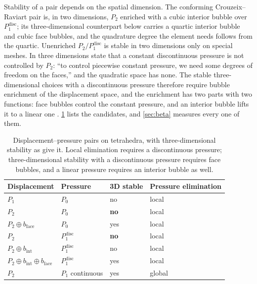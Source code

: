 \documentclass{article}
\theoremstyle{definition}
\theoremstyle{plain}
\begin{document}
Stability of a pair depends on the spatial dimension. The conforming Crouzeix--Raviart pair \cite{CrouzeixRaviart:1973} is, in two
dimensions, $P_2$ enriched with a cubic interior bubble over
$P_1^{\mathrm{disc}}$; its three-dimensional counterpart below carries a
quartic interior bubble and cubic face bubbles, and the quadrature degree the
element needs follows from the quartic. Unenriched
$P_2/P_1^{\mathrm{disc}}$ is stable in two dimensions only on special meshes.
In three dimensions \textcite[\S8.7]{BoffiBrezziFortin:2013} state that a
constant discontinuous pressure is not controlled by $P_2$: ``to control
piecewise constant pressure, we need some degrees of freedom on the faces,''
and the quadratic space has none. The stable three-dimensional choices with a
discontinuous pressure therefore require bubble enrichment of the displacement
space, and the enrichment has two parts with two functions: face bubbles control the
constant pressure, and an interior bubble lifts it to a linear one
\cite[Example~8.7.2]{BoffiBrezziFortin:2013}. \cref{tab:pairs} lists the
candidates, and \cref{sec:beta} measures every one of them.

\begin{table}[h]
\centering
\begin{tabular}{@{}llll@{}}
\toprule
Displacement & Pressure & 3D stable & Pressure elimination \\
\midrule
$P_1$                        & $P_0$                   & no  & local \\
$P_2$                        & $P_0$                   & \textbf{no} & local \\
$P_2 \oplus b_{\mathrm{face}}$ & $P_0$                 & yes & local \\
$P_2$                        & $P_1^{\mathrm{disc}}$   & \textbf{no} & local \\
$P_2 \oplus b_{\mathrm{int}}$ & $P_1^{\mathrm{disc}}$  & no  & local \\
$P_2 \oplus b_{\mathrm{int}} \oplus b_{\mathrm{face}}$ & $P_1^{\mathrm{disc}}$ & yes & local \\
$P_2$                        & $P_1$ continuous        & yes & global \\
\bottomrule
\end{tabular}
\caption{Displacement--pressure pairs on tetrahedra, with three-dimensional
stability as \textcite[\S8.7, Example~8.7.2]{BoffiBrezziFortin:2013} give it.
Local elimination
requires a discontinuous pressure; three-dimensional stability with a
discontinuous pressure requires face bubbles, and a linear pressure requires
an interior bubble as well.}
\label{tab:pairs}
\end{table}
\end{document}
